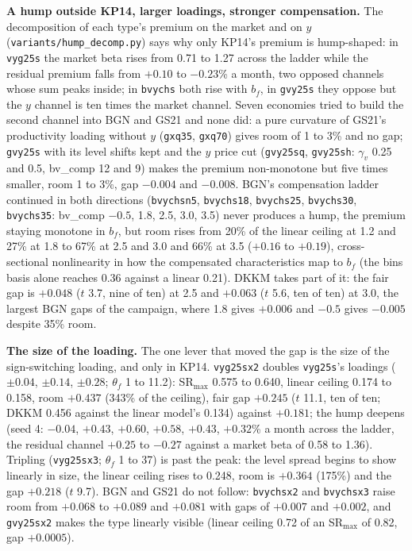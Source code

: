 \noindent\textbf{A hump outside KP14, larger loadings, stronger compensation.} The decomposition of each type's premium on the market and on $y$ (\texttt{variants/hump\_decomp.py}) says why only KP14's premium is hump-shaped: in \texttt{vyg25s} the market beta rises from 0.71 to 1.27 across the ladder while the residual premium falls from $+0.10$ to $-0.23$\% a month, two opposed channels whose sum peaks inside; in \texttt{bvychs} both rise with $b_f$, in \texttt{gvy25s} they oppose but the $y$ channel is ten times the market channel. Seven economies tried to build the second channel into BGN and GS21 and none did: a pure curvature of GS21's productivity loading without $y$ (\texttt{gxq35}, \texttt{gxq70}) gives room of 1 to 3\% and no gap; \texttt{gvy25s} with its level shifts kept and the $y$ price cut (\texttt{gvy25sq}, \texttt{gvy25sh}: $\gamma_v$ 0.25 and 0.5, bv\_comp 12 and 9) makes the premium non-monotone but five times smaller, room 1 to 3\%, gap $-0.004$ and $-0.008$. BGN's compensation ladder continued in both directions (\texttt{bvychsn5}, \texttt{bvychs18}, \texttt{bvychs25}, \texttt{bvychs30}, \texttt{bvychs35}: bv\_comp $-0.5$, 1.8, 2.5, 3.0, 3.5) never produces a hump, the premium staying monotone in $b_f$, but room rises from 20\% of the linear ceiling at 1.2 and 27\% at 1.8 to 67\% at 2.5 and 3.0 and 66\% at 3.5 ($+0.16$ to $+0.19$), cross-sectional nonlinearity in how the compensated characteristics map to $b_f$ (the bins basis alone reaches 0.36 against a linear 0.21). DKKM takes part of it: the fair gap is $+0.048$ ($t$ 3.7, nine of ten) at 2.5 and $+0.063$ ($t$ 5.6, ten of ten) at 3.0, the largest BGN gaps of the campaign, where 1.8 gives $+0.006$ and $-0.5$ gives $-0.005$ despite 35\% room.

\noindent\textbf{The size of the loading.} The one lever that moved the gap is the size of the sign-switching loading, and only in KP14. \texttt{vyg25sx2} doubles \texttt{vyg25s}'s loadings ($\pm0.04$, $\pm0.14$, $\pm0.28$; $\theta_f$ 1 to 11.2): SR$_{\max}$ 0.575 to 0.640, linear ceiling 0.174 to 0.158, room $+0.437$ (343\% of the ceiling), fair gap $+0.245$ ($t$ 11.1, ten of ten; DKKM 0.456 against the linear model's 0.134) against $+0.181$; the hump deepens (seed 4: $-0.04$, $+0.43$, $+0.60$, $+0.58$, $+0.43$, $+0.32$\% a month across the ladder, the residual channel $+0.25$ to $-0.27$ against a market beta of 0.58 to 1.36). Tripling (\texttt{vyg25sx3}; $\theta_f$ 1 to 37) is past the peak: the level spread begins to show linearly in size, the linear ceiling rises to 0.248, room is $+0.364$ (175\%) and the gap $+0.218$ ($t$ 9.7). BGN and GS21 do not follow: \texttt{bvychsx2} and \texttt{bvychsx3} raise room from $+0.068$ to $+0.089$ and $+0.081$ with gaps of $+0.007$ and $+0.002$, and \texttt{gvy25sx2} makes the type linearly visible (linear ceiling 0.72 of an SR$_{\max}$ of 0.82, gap $+0.0005$).

